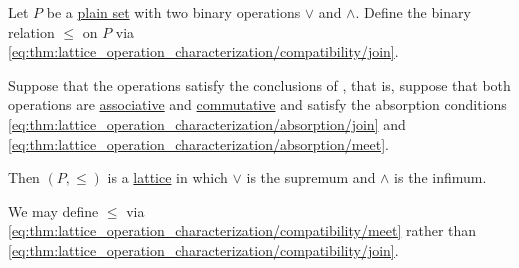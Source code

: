 \begin{proposition}\label{thm:lattice_from_binary_operations}
  Let \( P \) be a \hyperref[def:set]{plain set} with two binary operations \( \vee \) and \( \wedge \). Define the binary relation \( \leq \) on \( P \) via \eqref{eq:thm:lattice_operation_characterization/compatibility/join}.

  Suppose that the operations satisfy the conclusions of , that is, suppose that both operations are \hyperref[def:binary_operation/associative]{associative} and \hyperref[def:binary_operation/commutative]{commutative} and satisfy the absorption conditions \eqref{eq:thm:lattice_operation_characterization/absorption/join} and \eqref{eq:thm:lattice_operation_characterization/absorption/meet}.

  Then \( (P, \leq) \) is a \hyperref[def:lattice]{lattice} in which \( \vee \) is the supremum and \( \wedge \) is the infimum.
\end{proposition}
\begin{comments}
  \item We may define \( \leq \) via \eqref{eq:thm:lattice_operation_characterization/compatibility/meet} rather than \eqref{eq:thm:lattice_operation_characterization/compatibility/join}.
\end{comments}
